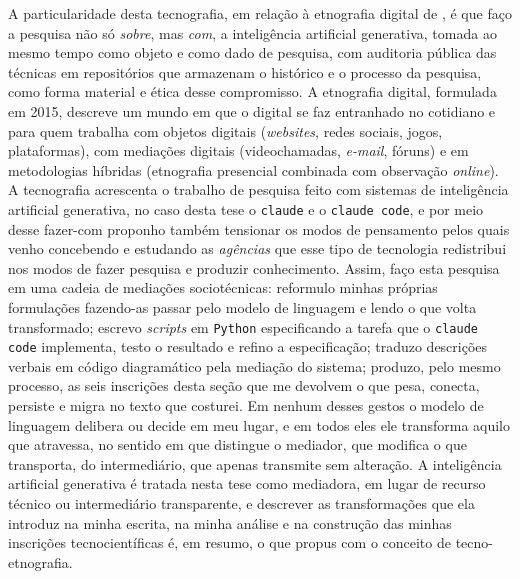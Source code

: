 A particularidade desta tecnografia, em relação à etnografia digital de \textcite{Pink2016DigitalEthnography}, é que faço a pesquisa não só \textit{sobre}, mas \textit{com}, a inteligência artificial generativa, tomada ao mesmo tempo como objeto e como dado de pesquisa, com auditoria pública das técnicas em repositórios que armazenam o histórico e o processo da pesquisa, como forma material e ética desse compromisso. A etnografia digital, formulada em 2015, descreve um mundo em que o digital se faz entranhado no cotidiano e para quem trabalha com objetos digitais (\emph{websites}, redes sociais, jogos, plataformas), com mediações digitais (videochamadas, \textit{e-mail}, fóruns) e em metodologias híbridas (etnografia presencial combinada com observação \emph{online}). A tecnografia acrescenta o trabalho de pesquisa feito com sistemas de inteligência artificial generativa, no caso desta tese o \texttt{claude} e o \texttt{claude code}, e por meio desse fazer-com proponho também tensionar os modos de pensamento pelos quais venho concebendo e estudando as \emph{agências} que esse tipo de tecnologia redistribui nos modos de fazer pesquisa e produzir conhecimento. Assim, faço esta pesquisa em uma cadeia de mediações sociotécnicas: reformulo minhas próprias formulações fazendo-as passar pelo modelo de linguagem e lendo o que volta transformado; escrevo \emph{scripts} em \texttt{Python} especificando a tarefa que o \texttt{claude code} implementa, testo o resultado e refino a especificação; traduzo descrições verbais em código diagramático pela mediação do sistema; produzo, pelo mesmo processo, as seis inscrições desta seção que me devolvem o que pesa, conecta, persiste e migra no texto que costurei. Em nenhum desses gestos o modelo de linguagem delibera ou decide em meu lugar, e em todos eles ele transforma aquilo que atravessa, no sentido em que \textcite{Latour2017Esperanca} distingue o mediador, que modifica o que transporta, do intermediário, que apenas transmite sem alteração. A inteligência artificial generativa é tratada nesta tese como mediadora, em lugar de recurso técnico ou intermediário transparente, e descrever as transformações que ela introduz na minha escrita, na minha análise e na construção das minhas inscrições tecnocientíficas é, em resumo, o que propus com o conceito de tecno-etnografia.

